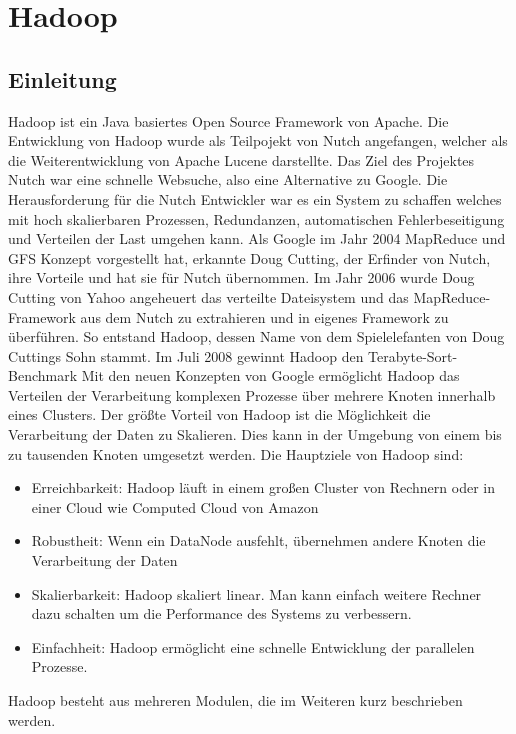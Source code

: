 \section{Hadoop}
\cite{Wartal2012}
\cite{Endlich2011}
\subsection{Einleitung}
Hadoop ist ein Java basiertes Open Source Framework von Apache. 
Die Entwicklung von Hadoop wurde als Teilpojekt von Nutch angefangen, welcher als die  Weiterentwicklung von Apache Lucene darstellte. Das Ziel des Projektes Nutch war eine schnelle Websuche, also eine Alternative zu Google. Die Herausforderung für die Nutch Entwickler war es ein System zu schaffen welches mit hoch skalierbaren Prozessen, Redundanzen, automatischen Fehlerbeseitigung und Verteilen der Last umgehen kann.  Als Google im Jahr 2004 MapReduce und GFS Konzept vorgestellt hat, erkannte Doug Cutting, der Erfinder von Nutch, ihre Vorteile und hat sie für Nutch  übernommen. Im Jahr 2006 wurde Doug Cutting von Yahoo angeheuert das verteilte Dateisystem und das MapReduce-Framework aus dem Nutch zu extrahieren und in eigenes Framework zu überführen. So entstand Hadoop, dessen Name von dem Spielelefanten von Doug Cuttings Sohn stammt. Im Juli 2008 gewinnt Hadoop den Terabyte-Sort-Benchmark \cite[S. 24]{Wartal2012}
Mit den neuen Konzepten von Google ermöglicht Hadoop das Verteilen der Verarbeitung komplexen Prozesse über mehrere Knoten innerhalb eines Clusters. Der größte Vorteil von Hadoop ist die Möglichkeit die  Verarbeitung der Daten zu Skalieren. Dies kann in der Umgebung von einem bis zu tausenden Knoten umgesetzt werden.
Die Hauptziele von Hadoop sind:
\begin{itemize}
\item Erreichbarkeit: Hadoop läuft in einem großen Cluster von Rechnern oder in einer Cloud wie Computed Cloud von Amazon
\item Robustheit: Wenn ein DataNode ausfehlt, übernehmen andere Knoten die Verarbeitung der Daten
\item Skalierbarkeit: Hadoop skaliert linear. Man kann einfach weitere Rechner dazu schalten um die Performance des Systems zu verbessern.
\item Einfachheit: Hadoop ermöglicht eine schnelle Entwicklung der parallelen Prozesse.
\cite{HadoopInAction}
\end{itemize}
Hadoop besteht aus mehreren Modulen, die im Weiteren kurz beschrieben werden.
